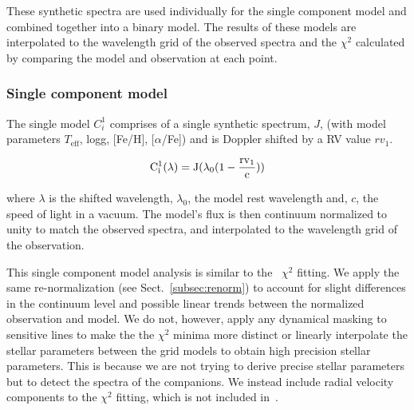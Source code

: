 These synthetic spectra are used individually for the single component model and combined together into a binary model. The results of these models are interpolated to the wavelength grid of the observed spectra and the \(\chi^{2} \) calculated by comparing the model and observation at each point.


\subsubsection{Single component model}
\label{subsubsec:single-model}
The single model \(C^{1}_{i}\) comprises of a single synthetic spectrum, \(J\), (with model parameters \(T_{\textrm{eff}}\), logg, [Fe/H], [\(\alpha\)/Fe]) and is Doppler shifted by a RV value \({rv}_1\). 

\begin{equation}
\rm C^{1}_{i}(\lambda) = J(\lambda_0(1-\frac{{rv}_1}{c}))
\end{equation}

where \(\lambda\) is the shifted wavelength, \(\lambda_0\), the model rest wavelength and, \(c\), the speed of light in a vacuum. The model's flux is then continuum normalized to unity to match the observed spectra, and interpolated to the wavelength grid of the observation.

This single component model analysis is similar to the~\citet{passegger_fundamental_2016} \(\chi^2\) fitting. We apply the same re-normalization (see Sect.~\ref{subsec:renorm}) to account for slight differences in the continuum level and possible linear trends between the normalized observation and model. We do not, however, apply any dynamical masking to sensitive lines to make the the \(\chi^2\) minima more distinct or linearly interpolate the stellar parameters between the grid models to obtain high precision stellar parameters. This is because we are not trying to derive precise stellar parameters but to detect the spectra of the companions. We instead include radial velocity components to the \(\chi^2\) fitting, which is not included in~\citet{passegger_fundamental_2016}. 



